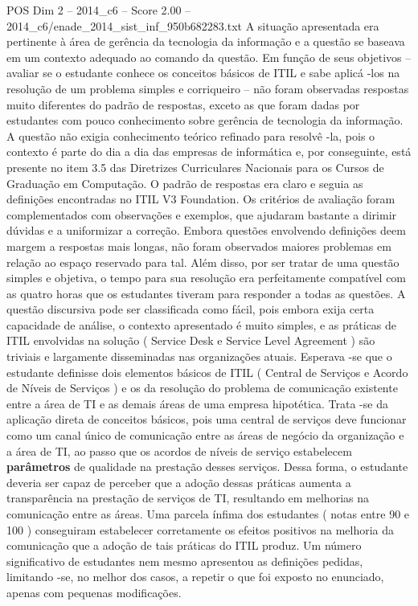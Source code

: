 \begin{textsample}{POS Dim 2 – 2014\_c6 – Score 2.00 – 2014\_c6/enade\_2014\_sist\_inf\_950b682283.txt}
A situação apresentada era pertinente à área de gerência da tecnologia da informação e a questão se baseava em um contexto adequado ao comando da questão.
Em função de seus objetivos – avaliar se o estudante conhece os conceitos básicos de ITIL e sabe aplicá -los na resolução de um problema simples e corriqueiro – não foram observadas respostas muito diferentes do padrão de respostas, exceto as que foram dadas por estudantes com pouco conhecimento sobre gerência de tecnologia da informação.
A questão não exigia conhecimento teórico refinado para resolvê -la, pois o contexto é parte do dia a dia das empresas de informática e, por conseguinte, está presente no item 3.5 das Diretrizes Curriculares Nacionais para os Cursos de Graduação em Computação.
O padrão de respostas era claro e seguia as definições encontradas no ITIL V3 Foundation.
Os critérios de avaliação foram complementados com observações e exemplos, que ajudaram bastante a dirimir dúvidas e a uniformizar a correção.
Embora questões envolvendo definições deem margem a respostas mais longas, não foram observados maiores problemas em relação ao espaço reservado para tal.
Além disso, por ser tratar de uma questão simples e objetiva, o tempo para sua resolução era perfeitamente compatível com as quatro horas que os estudantes tiveram para responder a todas as questões.
A questão discursiva pode ser classificada como fácil, pois embora exija certa capacidade de análise, o contexto apresentado é muito simples, e as práticas de ITIL envolvidas na solução ( Service Desk e Service Level Agreement ) são triviais e largamente disseminadas nas organizações atuais.
Esperava -se que o estudante definisse dois elementos básicos de ITIL ( Central de Serviços e Acordo de Níveis de Serviços ) e os da resolução do problema de comunicação existente entre a área de TI e as demais áreas de uma empresa hipotética.
Trata -se da aplicação direta de conceitos básicos, pois uma central de serviços deve funcionar como um canal único de comunicação entre as áreas de negócio da organização e a área de TI, ao passo que os acordos de níveis de serviço estabelecem \textbf{parâmetros} de qualidade na prestação desses serviços.
Dessa forma, o estudante deveria ser capaz de perceber que a adoção dessas práticas aumenta a transparência na prestação de serviços de TI, resultando em melhorias na comunicação entre as áreas.
Uma parcela ínfima dos estudantes ( notas entre 90 e 100 ) conseguiram estabelecer corretamente os efeitos positivos na melhoria da comunicação que a adoção de tais práticas do ITIL produz.
Um número significativo de estudantes nem mesmo apresentou as definições pedidas, limitando -se, no melhor dos casos, a repetir o que foi exposto no enunciado, apenas com pequenas modificações.

\end{textsample}
